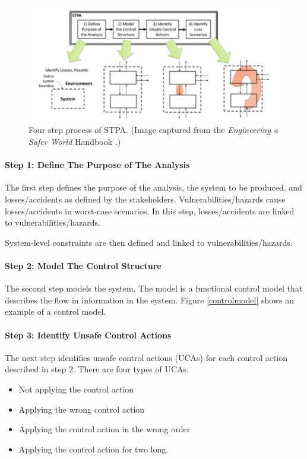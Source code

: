 \documentclass[../../main/main.tex]{subfiles}
\begin{document}
\begin{figure}[h]
\includegraphics[width=\linewidth]{../figures/4step}
\caption{\label{4step} Four step process of STPA. (Image captured from the \textit{Engineering a Safer World} Handbook \cite{safe}.)}
\end{figure}

\paragraph*{Step 1: Define The Purpose of The Analysis}
The first step defines the purpose of the analysis, the system to be produced, and losses/accidents as defined by the stakeholders.  Vulnerabilities/hazards cause losses/accidents in worst-case scenarios.  In this step, losses/accidents are linked to vulnerabilities/hazards.  

System-level constraints are then defined and linked to vulnerabilities/hazards.  


\paragraph*{Step 2: Model The Control Structure}
The second step models the system.  The model is a functional control model that describes the flow in information in the system.  Figure \ref{controlmodel} shows an example of a control model.


\paragraph*{Step 3: Identify Unsafe Control Actions}
The next step identifies unsafe control actions (UCAs) for each control action described in step 2.  There are four types of UCAs.
\begin{itemize}
\item Not applying the control action
\item Applying the wrong control action
\item Applying the control action in the wrong order
\item Applying the control action for two long.
\end{itemize}
\end{document}
